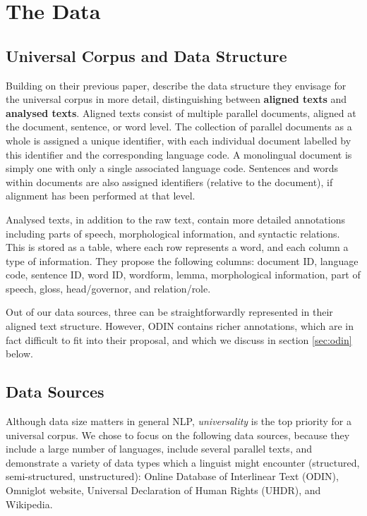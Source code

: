 \section{The Data}\label{sec:data}



\subsection{Universal Corpus and Data Structure} \label{sec:structure}

Building on their previous paper,  describe the data structure they envisage for the universal corpus in more detail, distinguishing between \textbf{aligned texts} and \textbf{analysed texts}. Aligned texts consist of multiple parallel documents, aligned at the document, sentence, or word level. The collection of parallel documents as a whole is assigned a unique identifier, with each individual document labelled by this identifier and the corresponding language code.  A monolingual document is simply one with only a single associated language code.  Sentences and words within documents are also assigned identifiers (relative to the document), if alignment has been performed at that level.

Analysed texts, in addition to the raw text, contain more detailed annotations including parts of speech, morphological information, and syntactic relations.  This is stored as a table, where each row represents a word, and each column a type of information.  They propose the following columns: document ID, language code, sentence ID, word ID, wordform, lemma, morphological information, part of speech, gloss, head/governor, and relation/role.

Out of our data sources, three can be straightforwardly represented in their aligned text structure. However, ODIN contains richer annotations, which are in fact difficult to fit into their proposal, and which we discuss in section \ref{sec:odin} below.


\subsection{Data Sources} \label{sec:sources}

Although data size matters in general NLP, \emph{universality} is the top priority for a universal corpus. We chose to focus on the following data sources, because they include a large number of languages, include several parallel texts, and demonstrate a variety of data types which a linguist might encounter (structured, semi-structured, unstructured): Online Database of Interlinear Text (ODIN), Omniglot website, Universal Declaration of Human Rights (UHDR), and Wikipedia.

